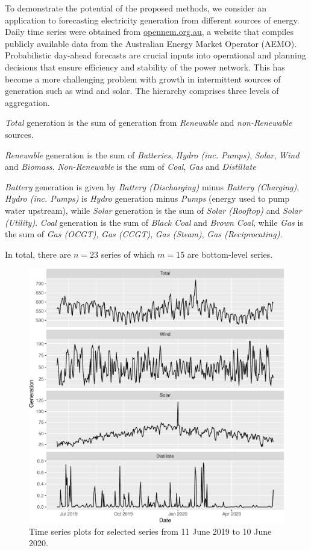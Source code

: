 \documentclass[a4paper,12pt]{article}
\theoremstyle{definition}
\begin{document}
To demonstrate the potential of the proposed methods, we consider an application to forecasting electricity generation from different sources of energy. Daily time series were obtained from \url{opennem.org.au}, a website that compiles publicly available data from the Australian Energy Market Operator (AEMO)\@. Probabilistic day-ahead forecasts are crucial inputs into operational and planning decisions that ensure efficiency and stability of the power network. This has become a more challenging problem with growth in intermittent sources of generation such as wind and solar. The hierarchy comprises three levels of aggregation.
\begin{compactenum}
	\item \textit{Total} generation is the sum of generation from \textit{Renewable} and \textit{non-Renewable} sources.
	\item \textit{Renewable} generation is the sum of \textit{Batteries}, \textit{Hydro (inc. Pumps)}, \textit{Solar}, \textit{Wind} and \textit{Biomass}. \textit{Non-Renewable} is the sum of \textit{Coal}, \textit{Gas} and \textit{Distillate}
	\item \textit{Battery} generation is given by \textit{Battery (Discharging)} minus \textit{Battery (Charging)}, \textit{Hydro (inc. Pumps)} is \textit{Hydro} generation minus \textit{Pumps} (energy used to pump water upstream), while \textit{Solar} generation is the sum of \textit{Solar (Rooftop)} and \textit{Solar (Utility)}. \textit{Coal} generation is the sum of \textit{Black Coal} and \textit{Brown Coal}, while \textit{Gas} is the sum of \textit{Gas (OCGT)}, \textit{Gas (CCGT)}, \textit{Gas (Steam)}, \textit{Gas (Reciprocating)}.
\end{compactenum}
In total, there are $n=23$ series of which $m=15$ are bottom-level series.

\begin{figure}[!htb]
  \centering
  \includegraphics[width=.75\textwidth]{selected.pdf}
  \caption{Time series plots for selected series from 11 June 2019 to 10 June 2020.}
  \label{fig:selected}
\end{figure}
\end{document}
